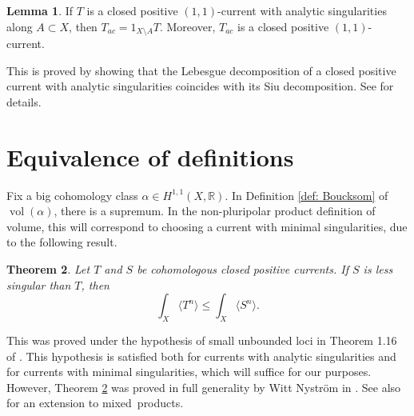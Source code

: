 \documentclass[a4paper]{amsart}
\newcommand{\R}{\mathbb{R}}
\newcommand{\vol}{\operatorname{vol}}
\newtheorem{theorem}{Theorem}[section]
\theoremstyle{definition}
\newtheorem{lemma}[theorem]{Lemma}
\begin{document}
\begin{lemma}\label{lem:leb}
If $T$ is a closed positive $(1,1)$-current with analytic singularities along $A\subset X$, then $T_{ac} =1_{X\setminus A}T$. Moreover, $T_{ac}$ is a closed positive $(1, 1)$-current.
\end{lemma}
This is proved by showing that the Lebesgue decomposition of a closed positive current with analytic singularities coincides with its Siu decomposition. See \cite[Subsection 2.3]{Boucksom} for details.
\section{Equivalence of definitions}\label{sec:3}
Fix a big cohomology class $\alpha \in H^{1, 1}(X, \R)$. In Definition \ref{def: Boucksom} of $\vol(\alpha)$, there is a supremum. In the non-pluripolar product definition of volume, this will correspond to choosing a current with minimal singularities, due to the following result.
\begin{theorem}\label{thm:monotone}
   Let $T$ and $S$ be cohomologous closed positive currents. If $S$ is less singular than $T$, then
\begin{equation*}
   \int_X \langle T^n\rangle \le \int_X \langle S^n\rangle. 
\end{equation*}
\end{theorem}
This was proved under the hypothesis of small unbounded loci in Theorem 1.16 of \cite{BEGZ}. This hypothesis is satisfied both for currents with analytic singularities and for currents with minimal singularities, which will suffice for our purposes. However, Theorem \ref{thm:monotone} was proved in full generality by Witt Nystr\"om in \cite{MonotonicityWN}. See also \cite{MonotonicityDDNL} for an extension to mixed~products.
\end{document}
